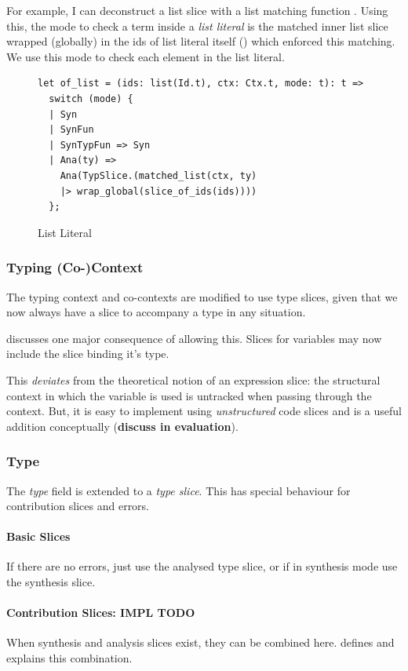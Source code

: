 For example, I can deconstruct a list slice with a list matching function . Using this, the mode to check a term inside a \textit{list literal} is the matched inner list slice wrapped (globally) in the ids of list literal itself () which enforced this matching. We use this mode to check each element in the list literal.

\begin{figure}
\begin{verbatim}
let of_list = (ids: list(Id.t), ctx: Ctx.t, mode: t): t =>
  switch (mode) {
  | Syn
  | SynFun
  | SynTypFun => Syn
  | Ana(ty) =>
    Ana(TypSlice.(matched_list(ctx, ty) 
    |> wrap_global(slice_of_ids(ids))))
  };
\end{verbatim}
\caption{List Literal }
\end{figure}

\subsubsection{Typing (Co-)Context}
The typing context and co-contexts are modified to use type slices, given that we now always have a slice to accompany a type in any situation. 

 discusses one major consequence of allowing this. Slices for variables may now include the slice binding it's type. 

This \textit{deviates} from the theoretical notion of an expression slice: the structural context in which the variable is used is untracked when passing through the context. But, it is easy to implement using \textit{unstructured} code slices and is a useful addition conceptually (\textbf{discuss in evaluation}).

\subsubsection{Type}
The \textit{type} field is extended to a \textit{type slice}. This has special behaviour for contribution slices and errors.
\paragraph{Basic Slices} 
If there are no errors, just use the analysed type slice, or if in synthesis mode use the synthesis slice. 
\paragraph{Contribution Slices: IMPL TODO}
When synthesis and analysis slices exist, they can be combined here.  defines and explains this combination.

